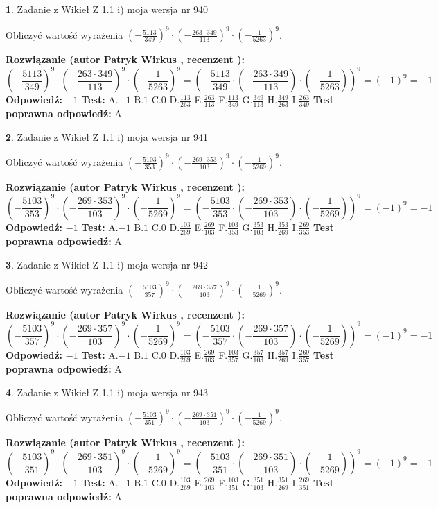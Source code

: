 \documentclass[12pt, a4paper]{article}
\theoremstyle{definition} %
\newtheorem{zad}{}
\newcommand{\zadStart}[1]{\begin{zad}#1\newline}
\newcommand{\zadStop}{\end{zad}}
\newcommand{\rozwStart}[2]{\noindent \textbf{Rozwiązanie (autor #1 , recenzent #2): }\newline}
\newcommand{\rozwStop}{\newline}
\newcommand{\odpStart}{\noindent \textbf{Odpowiedź:}\newline}
\newcommand{\odpStop}{\newline}
\newcommand{\testStart}{\noindent \textbf{Test:}\newline}
\newcommand{\testStop}{\newline}
\newcommand{\kluczStart}{\noindent \textbf{Test poprawna odpowiedź:}\newline}
\newcommand{\kluczStop}{\newline}
\begin{document}
\zadStart{Zadanie z Wikieł Z 1.1 i) moja wersja nr 940}

Obliczyć wartość wyrażenia $(-\frac{5113}{349})^{9} \cdot (-\frac{263 \cdot 349}{113})^{9} \cdot (-\frac{1}{5263})^{9}$.
\zadStop
\rozwStart{Patryk Wirkus}{}
$$(-\frac{5113}{349})^{9} \cdot (-\frac{263 \cdot 349}{113})^{9} \cdot (-\frac{1}{5263})^{9} = (-\frac{5113}{349} \cdot (-\frac{263 \cdot 349}{113}) \cdot (-\frac{1}{5263}))^{9} = (-1)^{9} = -1$$
\rozwStop
\odpStart
$-1$
\odpStop
\testStart
A.$-1$ B.$1$ C.$0$ D.$\frac{113}{263}$ E.$\frac{263}{113}$
F.$\frac{113}{349}$ G.$\frac{349}{113}$
H.$\frac{349}{263}$
I.$\frac{263}{349}$
\testStop
\kluczStart
A
\kluczStop



\zadStart{Zadanie z Wikieł Z 1.1 i) moja wersja nr 941}

Obliczyć wartość wyrażenia $(-\frac{5103}{353})^{9} \cdot (-\frac{269 \cdot 353}{103})^{9} \cdot (-\frac{1}{5269})^{9}$.
\zadStop
\rozwStart{Patryk Wirkus}{}
$$(-\frac{5103}{353})^{9} \cdot (-\frac{269 \cdot 353}{103})^{9} \cdot (-\frac{1}{5269})^{9} = (-\frac{5103}{353} \cdot (-\frac{269 \cdot 353}{103}) \cdot (-\frac{1}{5269}))^{9} = (-1)^{9} = -1$$
\rozwStop
\odpStart
$-1$
\odpStop
\testStart
A.$-1$ B.$1$ C.$0$ D.$\frac{103}{269}$ E.$\frac{269}{103}$
F.$\frac{103}{353}$ G.$\frac{353}{103}$
H.$\frac{353}{269}$
I.$\frac{269}{353}$
\testStop
\kluczStart
A
\kluczStop



\zadStart{Zadanie z Wikieł Z 1.1 i) moja wersja nr 942}

Obliczyć wartość wyrażenia $(-\frac{5103}{357})^{9} \cdot (-\frac{269 \cdot 357}{103})^{9} \cdot (-\frac{1}{5269})^{9}$.
\zadStop
\rozwStart{Patryk Wirkus}{}
$$(-\frac{5103}{357})^{9} \cdot (-\frac{269 \cdot 357}{103})^{9} \cdot (-\frac{1}{5269})^{9} = (-\frac{5103}{357} \cdot (-\frac{269 \cdot 357}{103}) \cdot (-\frac{1}{5269}))^{9} = (-1)^{9} = -1$$
\rozwStop
\odpStart
$-1$
\odpStop
\testStart
A.$-1$ B.$1$ C.$0$ D.$\frac{103}{269}$ E.$\frac{269}{103}$
F.$\frac{103}{357}$ G.$\frac{357}{103}$
H.$\frac{357}{269}$
I.$\frac{269}{357}$
\testStop
\kluczStart
A
\kluczStop



\zadStart{Zadanie z Wikieł Z 1.1 i) moja wersja nr 943}

Obliczyć wartość wyrażenia $(-\frac{5103}{351})^{9} \cdot (-\frac{269 \cdot 351}{103})^{9} \cdot (-\frac{1}{5269})^{9}$.
\zadStop
\rozwStart{Patryk Wirkus}{}
$$(-\frac{5103}{351})^{9} \cdot (-\frac{269 \cdot 351}{103})^{9} \cdot (-\frac{1}{5269})^{9} = (-\frac{5103}{351} \cdot (-\frac{269 \cdot 351}{103}) \cdot (-\frac{1}{5269}))^{9} = (-1)^{9} = -1$$
\rozwStop
\odpStart
$-1$
\odpStop
\testStart
A.$-1$ B.$1$ C.$0$ D.$\frac{103}{269}$ E.$\frac{269}{103}$
F.$\frac{103}{351}$ G.$\frac{351}{103}$
H.$\frac{351}{269}$
I.$\frac{269}{351}$
\testStop
\kluczStart
A
\kluczStop
\end{document}
